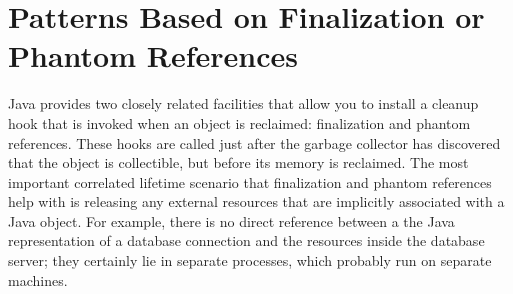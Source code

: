 \section{Patterns Based on Finalization or Phantom References}


Java provides two closely related facilities that allow you to install a cleanup
hook that is invoked when an object is reclaimed: finalization and phantom
references. These hooks are called just after the garbage collector has
discovered that the object is collectible, but before its memory is reclaimed.
The most important correlated lifetime scenario that finalization and phantom
references help with is releasing any external resources that are implicitly
associated with a Java object. For example, there is no direct reference between
a the Java representation of a database connection and the resources inside the
database server; they certainly lie in separate processes, which probably run on
separate machines.

